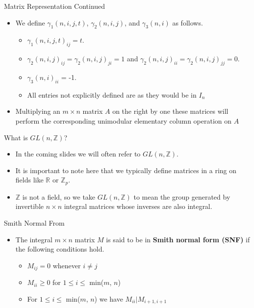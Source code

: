 \documentclass{beamer}
\begin{document}
\begin{frame}{Matrix Representation Continued}
    \begin{itemize}
        \item We define $\gamma_1(n, i, j, t)$, $\gamma_2(n, i, j)$, and $\gamma_3(n, i)$ as follows.
        \begin{itemize}
            \item $\gamma_1(n, i, j, t)_{ij} = t$.
            \item $\gamma_2(n, i, j)_{ij} = \gamma_2(n, i, j)_{ji} = 1$ and $\gamma_2(n, i, j)_{ii} = \gamma_2(n, i, j)_{jj} = 0$.
            \item $\gamma_3(n, i)_{ii}$ = -1.
            \item All entries not explicitly defined are as they would be in $I_n$
        \end{itemize}
        \item Multiplying an $m \times n$ matrix $A$ on the right by one these matrices will perform the corresponding unimodular elementary column operation on $A$
    \end{itemize}
\end{frame}
\begin{frame}{What is $GL(n, \mathbb{Z})$?}
    \begin{itemize}
        \item In the coming slides we will often refer to $GL(n, \mathbb{Z})$.
        \item It is important to note here that we typically define matrices in a ring on fields like $\mathbb{R}$ or $\mathbb{Z}_p$.
        \item $\mathbb{Z}$ is not a field, so we take $GL(n, \mathbb{Z})$ to mean the group generated by invertible $n \times n$ integral matrices whose inverses are also integral.
    \end{itemize}
\end{frame}
\begin{frame}{Smith Normal From}
    \begin{itemize}
        \item The integral $m \times n$ matrix $M$ is said to be in \textbf{Smith normal form (SNF)} if the following conditions hold.
        \begin{itemize}
            \item $M_{ij} = 0$ whenever $i \neq j$
            \item $M_{ii} \geq 0$ for $1 \leq i \leq$ min($m$, $n$)
            \item For $1 \leq i \leq$ min($m$, $n$) we have $M_{ii}|M_{i+1, i+1}$
        \end{itemize}
    \end{itemize}
\end{frame}
\end{document}
